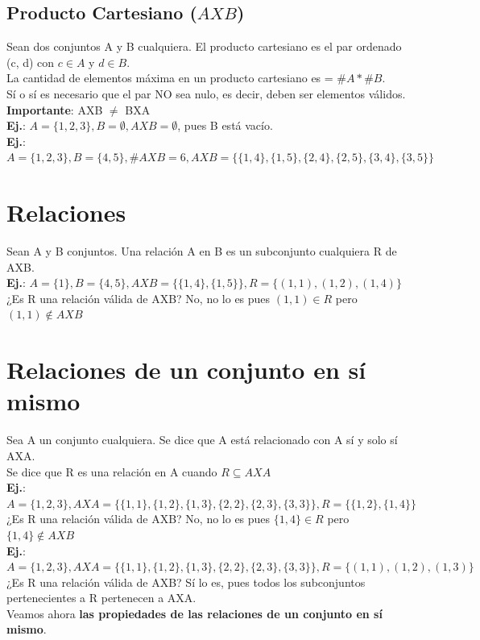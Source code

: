 \documentclass[10pt,a4paper]{article}
\begin{document}
\subsection*{Producto Cartesiano ($A X B$)}
Sean dos conjuntos A y B cualquiera. El producto cartesiano es el par ordenado (c, d) con $c \in A$ y $d \in B$. \\ 
La cantidad de elementos máxima en un producto cartesiano es = $\#A \ast \#B$. \\
Sí o sí es necesario que el par NO sea nulo, es decir, deben ser elementos válidos. \\
\textbf{Importante}: AXB $\neq$ BXA \\
\textbf{Ej.}: $A = \{1, 2, 3\}, B = \emptyset, AXB = \emptyset$, pues B está vacío. \\
\textbf{Ej.}: $A = \{1, 2, 3\}, B = \{4, 5\}, \#AXB = 6, AXB = \{\{1, 4\}, \{1, 5\}, \{2, 4\}, \{2, 5\}, \{3, 4\}, \{3, 5\} \}$
\section*{Relaciones}
Sean A y B conjuntos. Una relación A en B es un subconjunto cualquiera R de AXB. \\
\textbf{Ej.}: $A = \{1\}, B = \{4, 5\}, AXB=\{\{1, 4\}, \{1, 5\}\}, R = \{(1, 1), (1, 2), (1, 4)\}$ ¿Es R una relación válida de AXB? No, no lo es pues $(1, 1) \in R$ pero $ (1, 1) \notin AXB$
\section*{Relaciones de un conjunto en sí mismo}
Sea A un conjunto cualquiera. Se dice que A está relacionado con A sí y solo sí AXA. \\
Se dice que R es una relación en A cuando $ R \subseteq AXA$ \\
\textbf{Ej.}: $A = \{1, 2, 3\}, AXA=\{\{1, 1\}, \{1, 2\}, \{1, 3\}, \{2, 2\}, \{2, 3\}, \{3, 3\}\}, R = \{\{1, 2\}, \{1, 4\}\}$ ¿Es R una relación válida de AXB? No, no lo es pues $\{1, 4\} \in R$ pero $ \{1, 4\} \notin AXB$ \\
\textbf{Ej.}: $A = \{1, 2, 3\}, AXA=\{\{1, 1\}, \{1, 2\}, \{1, 3\}, \{2, 2\}, \{2, 3\}, \{3, 3\}\}, R = \{(1, 1), (1, 2), (1, 3)\}$ ¿Es R una relación válida de AXB? Sí lo es, pues todos los subconjuntos pertenecientes a R pertenecen a AXA. \\
Veamos ahora \textbf{las propiedades de las relaciones de un conjunto en sí mismo}.
\end{document}
